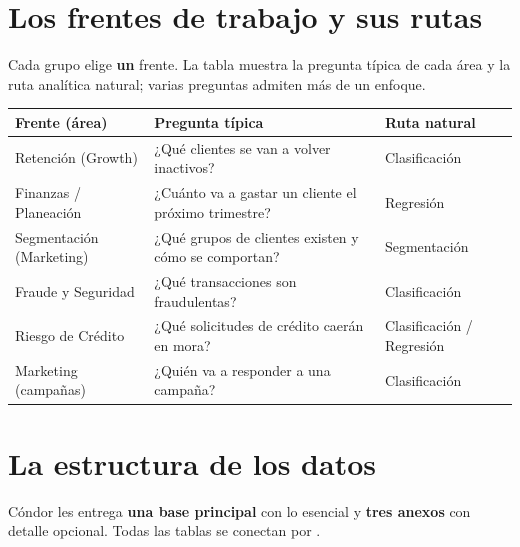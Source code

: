 \documentclass[11pt,letterpaper]{article}
\newcommand{\var}[1]{\texttt{\detokenize{#1}}}
\begin{document}
\section{Los frentes de trabajo y sus rutas}

Cada grupo elige \textbf{un} frente. La tabla muestra la pregunta típica de cada área y la ruta analítica natural; varias preguntas admiten más de un enfoque.

\begin{center}
\footnotesize
\begin{tabularx}{\textwidth}{L{3.0cm} X L{2.9cm}}
  \toprule
  \textbf{Frente (área)} & \textbf{Pregunta típica} & \textbf{Ruta natural} \\
  \midrule
  Retención (Growth) & ¿Qué clientes se van a volver inactivos? & Clasificación \\
  Finanzas / Planeación & ¿Cuánto va a gastar un cliente el próximo trimestre? & Regresión \\
  Segmentación (Marketing) & ¿Qué grupos de clientes existen y cómo se comportan? & Segmentación \\
  Fraude y Seguridad & ¿Qué transacciones son fraudulentas? & Clasificación \\
  Riesgo de Crédito & ¿Qué solicitudes de crédito caerán en mora? & Clasificación / Regresión \\
  Marketing (campañas) & ¿Quién va a responder a una campaña? & Clasificación \\
  \bottomrule
\end{tabularx}
\end{center}

\section{La estructura de los datos}

Cóndor les entrega \textbf{una base principal} con lo esencial y \textbf{tres anexos} con detalle opcional. Todas las tablas se conectan por \var{cliente_id}.
\end{document}
